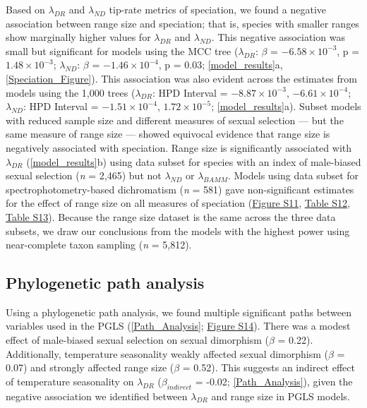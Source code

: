 \documentclass[]{article}
\begin{document}
Based on \(\lambda_{DR}\) and \(\lambda_{ND}\) tip-rate metrics of
speciation, we found a negative association between range size and
speciation; that is, species with smaller ranges show marginally higher
values for \(\lambda_{DR}\) and \(\lambda_{ND}\). This negative
association was small but significant for models using the MCC tree
(\(\lambda_{DR}\): \(\beta\) = \(-6.58 \times 10^{-3}\), p =
\(1.48 \times 10^{-3}\); \(\lambda_{ND}\): \(\beta\) =
\(-1.46 \times 10^{-4}\), p = 0.03; \autoref{model_results}a,
\autoref{Speciation_Figure}). This association was also evident across
the estimates from models using the 1,000 trees (\(\lambda_{DR}\): HPD
Interval = \(-8.87 \times 10^{-3}\), \(-6.61 \times 10^{-4}\);
\(\lambda_{ND}\): HPD Interval = \(-1.51 \times 10^{-4}\),
\(1.72 \times 10^{-5}\); \autoref{model_results}a). Subset models with
reduced sample size and different measures of sexual selection --- but
the same measure of range size --- showed equivocal evidence that range
size is negatively associated with speciation. Range size is
significantly associated with \(\lambda_{DR}\)
(\autoref{model_results}b) using data subset for species with an index
of male-biased sexual selection (\emph{n} = 2,465) but not
\(\lambda_{ND}\) or \(\lambda_{BAMM}\). Models using data subset for
spectrophotometry-based dichromatism (\emph{n} = 581) gave
non-significant estimates for the effect of range size on all measures
of speciation
(\href{https://justincally.github.io/SexualSelection_Speciation/#subsetted_analysis_with_spectrophotometry_data}{Figure S11},
\href{https://justincally.github.io/SexualSelection_Speciation/#subsetted_analysis_with_spectrophotometry_data}{Table S12},
\href{https://justincally.github.io/SexualSelection_Speciation/#subsetted_analysis_with_spectrophotometry_data}{Table S13}).
Because the range size dataset is the same across the three data
subsets, we draw our conclusions from the models with the highest power
using near-complete taxon sampling (\emph{n} = 5,812). 

\hypertarget{phylogenetic-path-analysis}{%
\subsection{Phylogenetic path
analysis}\label{phylogenetic-path-analysis}}

Using a phylogenetic path analysis, we found multiple significant paths
between variables used in the PGLS (\autoref{Path_Analysis};
\href{https://justincally.github.io/SexualSelection_Speciation/#phylogenetic_path_analysis}{Figure S14}).
There was a modest effect of male-biased sexual selection on sexual
dimorphism (\(\beta\) = 0.22). Additionally, temperature seasonality
weakly affected sexual dimorphism (\(\beta\) = 0.07) and strongly
affected range size (\(\beta\) = 0.52). This suggests an indirect effect
of temperature seasonality on \(\lambda_{DR}\) (\(\beta_{indirect}\) =
-0.02; \autoref{Path_Analysis}), given the negative association we
identified between \(\lambda_{DR}\) and range size in PGLS models.
\end{document}
